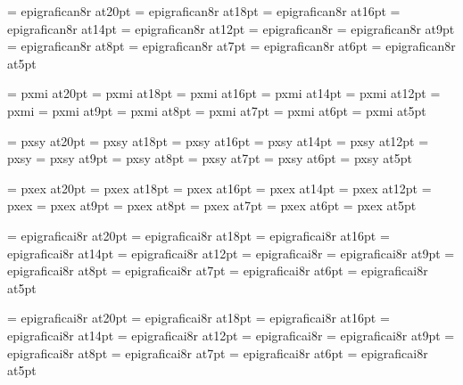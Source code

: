 
\font\twentyrm=     epigrafican8r at20pt
\font\eighteenrm=   epigrafican8r at18pt
\font\sixteenrm=    epigrafican8r at16pt
\font\fourteenrm=   epigrafican8r at14pt
\font\twelverm=     epigrafican8r at12pt
\font\tenrm=        epigrafican8r
\font\ninerm=       epigrafican8r at9pt
\font\eightrm=      epigrafican8r at8pt
\font\sevenrm=      epigrafican8r at7pt
\font\sixrm=        epigrafican8r at6pt
\font\fiverm=       epigrafican8r at5pt

\font\twentyi=      pxmi at20pt
\font\eighteeni=    pxmi at18pt
\font\sixteeni=     pxmi at16pt
\font\fourteeni=    pxmi at14pt
\font\twelvei=      pxmi at12pt
\font\teni=         pxmi
\font\ninei=        pxmi at9pt
\font\eighti=       pxmi at8pt
\font\seveni=       pxmi at7pt
\font\sixi=         pxmi at6pt
\font\fivei=        pxmi at5pt

\font\twentysy=     pxsy at20pt
\font\eighteensy=   pxsy at18pt
\font\sixteensy=    pxsy at16pt
\font\fourteensy=   pxsy at14pt
\font\twelvesy=     pxsy at12pt
\font\tensy=        pxsy
\font\ninesy=       pxsy at9pt
\font\eightsy=      pxsy at8pt
\font\sevensy=      pxsy at7pt
\font\sixsy=        pxsy at6pt
\font\fivesy=       pxsy at5pt

\font\twentyex=     pxex at20pt
\font\eighteenex=   pxex at18pt
\font\sixteenex=    pxex at16pt
\font\fourteenex=   pxex at14pt
\font\twelveex=     pxex at12pt
\font\tenex=        pxex
\font\nineex=       pxex at9pt
\font\eightex=      pxex at8pt
\font\sevenex=      pxex at7pt
\font\sixex=        pxex at6pt
\font\fiveex=       pxex at5pt

\font\twentyit=     epigraficai8r at20pt
\font\eighteenit=   epigraficai8r at18pt
\font\sixteenit=    epigraficai8r at16pt
\font\fourteenit=   epigraficai8r at14pt
\font\twelveit=     epigraficai8r at12pt
\font\tenit=        epigraficai8r
\font\nineit=       epigraficai8r at9pt
\font\eightit=      epigraficai8r at8pt
\font\sevenit=      epigraficai8r at7pt
\font\sixit=        epigraficai8r at6pt
\font\fiveit=       epigraficai8r at5pt

\font\twentysl=     epigraficai8r at20pt
\font\eighteensl=   epigraficai8r at18pt
\font\sixteensl=    epigraficai8r at16pt
\font\fourteensl=   epigraficai8r at14pt
\font\twelvesl=     epigraficai8r at12pt
\font\tensl=        epigraficai8r
\font\ninesl=       epigraficai8r at9pt
\font\eightsl=      epigraficai8r at8pt
\font\sevensl=      epigraficai8r at7pt
\font\sixsl=        epigraficai8r at6pt
\font\fivesl=       epigraficai8r at5pt

